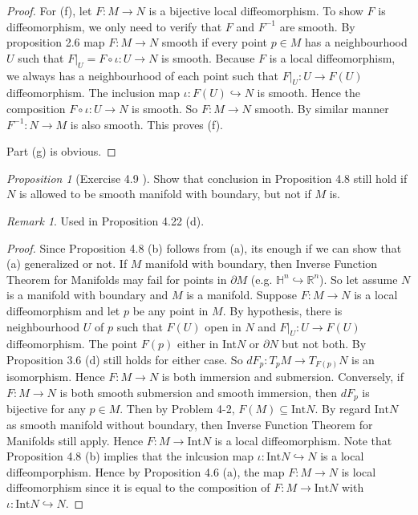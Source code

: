\documentclass[a4paper]{article}
\theoremstyle{remark}
\newtheorem*{remark}{Remark}
\newtheorem{prop}{Proposition}
\newcommand{\rn}{\mathbb{R}^n} %
\newcommand{\hn}{\mathbb{H}^n} %
\newcommand{\hmap}{\hookrightarrow} %
\newcommand{\doo}{\partial}    %
\begin{document}
\begin{proof}
For (f), let $F : M \to N$ is a bijective local diffeomorphism. To show $F$ is diffeomorphism, we only need to verify that $F$ and $F^{-1}$ are smooth. By proposition 2.6 map $F : M \to N$ smooth if every point $p \in M$ has a neighbourhood $U$ such that $F|_U = F \circ \iota : U \to N$ is smooth. Because $F$ is a local diffeomorphism, we always has a neighbourhood of each point such that $F|_U : U \to F(U)$ diffeomorphism. The inclusion map $\iota : F(U) \hmap N$ is smooth. Hence the composition $F \circ \iota : U \to N$ is smooth. So $F : M \to N$ smooth. By similar manner $F^{-1} : N \to M$ is also smooth. This proves (f).

Part (g) is obvious.
\end{proof}

\begin{prop}[Exercise 4.9 \cite{LeeSM}]
Show that conclusion in Proposition 4.8 still hold if $N$ is allowed to be smooth manifold with boundary, but not if $M$ is.
\end{prop}
\begin{remark}
Used in Proposition 4.22 (d).
\end{remark}
\begin{proof}
Since Proposition 4.8 (b) follows from (a), its enough if we can show that (a) generalized or not. If $M$ manifold with boundary, then Inverse Function Theorem for Manifolds may fail for points in $\doo M$ (e.g. $\hn \hookrightarrow \rn$). So let assume $N$ is a manifold with boundary and $M$ is a manifold. Suppose $F : M \to N$ is a local diffeomorphism and let $p$ be any point in $M$. By hypothesis, there is neighbourhood $U$ of $p$ such that $F(U)$ open in $N$ and $F|_U : U \to F(U)$ diffeomorphism. The point $F(p)$ either in Int$N$ or $\doo N$ but not both. By Proposition 3.6 (d) still holds for either case. So $dF_p : T_p M \to T_{F(p)}N$ is an isomorphism. Hence $F : M \to N$ is both immersion and submersion. Conversely, if $F : M \to N$ is both smooth submersion and smooth immersion, then $dF_p$ is bijective for any $p \in M$. Then by Problem 4-2, $F(M) \subseteq \text{Int}N$. By regard $\text{Int}N$ as smooth manifold without boundary, then Inverse Function Theorem for Manifolds still apply. Hence $F : M \to \text{Int} N$ is a local diffeomorphism. Note that Proposition 4.8 (b) implies that the inlcusion map $\iota : \text{Int} N \hookrightarrow N$ is a local diffeomporphism. Hence by Proposition 4.6 (a), the map $F : M \to N$ is local diffeomorphism since it is equal to the composition of $F : M \to \text{Int}N$ with $\iota : \text{Int} N \hookrightarrow N$.
\end{proof}
\end{document}
